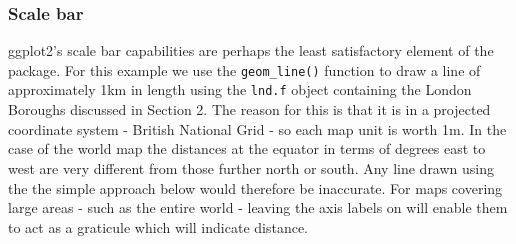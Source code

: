\documentclass[]{article}
\begin{document}
\subsubsection{Scale bar}

ggplot2's scale bar capabilities are perhaps the least satisfactory
element of the package. For this example we use the
\texttt{geom\_line()} function to draw a line of approximately 1km in
length using the \texttt{lnd.f} object containing the London Boroughs
discussed in Section 2. The reason for this is that it is in a projected
coordinate system - British National Grid - so each map unit is worth
1m. In the case of the world map the distances at the equator in terms
of degrees east to west are very different from those further north or
south. Any line drawn using the the simple approach below would
therefore be inaccurate. For maps covering large areas - such as the
entire world - leaving the axis labels on will enable them to act as a
graticule which will indicate distance.
\end{document}
